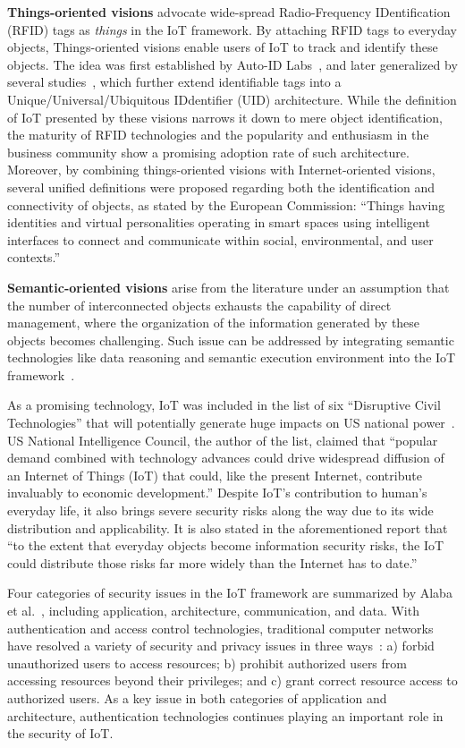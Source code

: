 \textbf{Things-oriented visions} advocate wide-spread Radio-Frequency IDentification (RFID) tags as \textit{things} in the IoT framework. By attaching RFID tags to everyday objects, Things-oriented visions enable users of IoT to track and identify these objects. The idea was first established by Auto-ID Labs~\cite{Auto-ID_Labs_2017-06-26}, and later generalized by several studies~\cite{epcglobal2004radio}\cite{DBLP:conf/icse/Sakamura06}, which further extend identifiable tags into a Unique/Universal/Ubiquitous IDdentifier (UID) architecture. While the definition of IoT presented by these visions narrows it down to mere object identification, the maturity of RFID technologies and the popularity and enthusiasm in the business community show a promising adoption rate of such architecture. Moreover, by combining things-oriented visions with Internet-oriented visions, several unified definitions were proposed regarding both the identification and connectivity of objects, as stated by the European Commission\cite{bassi2008internet}:
``Things having identities and virtual personalities operating
in smart spaces using intelligent interfaces to connect
and communicate within social, environmental, and user
contexts.''

\textbf{Semantic-oriented visions} arise from the literature under an assumption that the number of interconnected objects exhausts the capability of direct management, where the organization of the information generated by these objects becomes challenging. Such issue can be addressed by integrating semantic technologies like data reasoning and semantic execution environment into the IoT framework~\cite{toma2009joint}.

As a promising technology, IoT was included in the list of six ``Disruptive Civil Technologies'' that will potentially generate huge impacts on US national power~\cite{council2008six}. US National Intelligence Council, the author of the list, claimed that
``popular demand combined with technology advances could drive widespread diffusion of an Internet of Things (IoT) that could, like the present Internet, contribute invaluably to economic development.''
Despite IoT's contribution to human's everyday life, it also brings severe security risks along the way due to its wide distribution and applicability. It is also stated in the aforementioned report that
``to the extent that everyday objects become information security risks, the IoT could distribute those risks far more widely than the Internet has to date.''

Four categories of security issues in the IoT framework are summarized by Alaba et al.~\cite{DBLP:journals/jnca/AlabaOHA17}, including application, architecture, communication, and data. With authentication and access control technologies, traditional computer networks have resolved a variety of security and privacy issues in three ways~\cite{DBLP:conf/icdcsw/LiuXC12}: a) forbid unauthorized users to access resources; b) prohibit authorized users from accessing resources beyond their privileges; and c) grant correct resource access to authorized users. As a key issue in both categories of application and architecture, authentication technologies continues playing an important role in the security of IoT.

